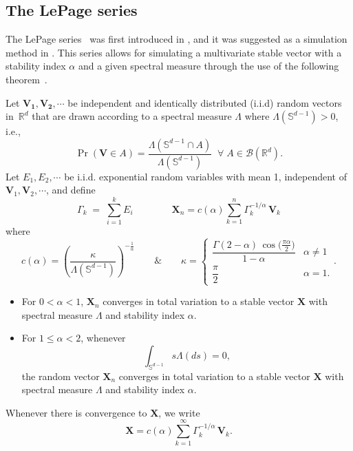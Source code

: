 \subsection{The LePage series}

The LePage series~\cite{SamorodnitskyGennady2000Snrp} was first introduced in \cite{LePageRaoul1981CtaS}, and it was suggested as a simulation method in \cite{Weron2004Computationally}. This series allows for simulating a multivariate stable vector with a stability index $\alpha$ and a given spectral measure through the use of the following theorem~\cite[Theorem 4]{BentkusV.2001LSRo}.
\begin{theorem}
\label{thm:spec2}
 Let $\mathbf{V_1},\mathbf{V_2},\cdots$ be independent and identically distributed (i.i.d) random vectors in~$\mathbb{R}^d$ that are drawn according to a spectral measure $\Lambda$ where $\Lambda(\mathbb{S}^{d-1})>0$, i.e.,
 \[
     \Pr(\mathbf{V}\in A)=\frac{\Lambda(\mathbb{S}^{d-1} ∩ A )}{\Lambda(\mathbb{S}^{d-1})} \;\;\forall\;A\in\mathcal{B}(\mathbb{R}^d).
 \]
 Let $E_1, E_2, \cdots$ be i.i.d. exponential random variables with mean 1, independent of  $\mathbf{V}_1, \mathbf{V}_2, \cdots$, and define
\begin{equation}
\label{LPseries}
\Gamma_k \;=\; \sum_{i=1}^k E_i \qquad
\qquad \mathbf{X}_n= c(\alpha)\sum_{k=1}^{n} \Gamma_k^{-1/\alpha}\,\mathbf{V}_k
\end{equation}
where  \[
c(\alpha)=\left(\frac{\kappa}{\Lambda(\mathbb{S}^{d-1})}\right)^{-\frac{1}{\alpha}} \qquad \& \qquad \kappa=\begin{cases}
\dfrac{\Gamma(2-\alpha)\,\cos\!\bigl(\tfrac{\pi\alpha}{2}\bigr)}{1-\alpha}
& \alpha\neq1\\
\dfrac{\pi}{2}
& \alpha=1.
\end{cases}.
\]
\begin{itemize}
\item[$\bullet$] For $0<\alpha<1$, $\mathbf{X}_n$ converges in total variation to a stable vector $\mathbf{X}$ with spectral measure $\Lambda$ and stability index $\alpha$.
\item[$\bullet$] For $1 \leq \alpha < 2$, whenever
\begin{equation}\label{eq:eq9}
\int_{\mathbb{S}^{d-1}}s\Lambda(ds)=0,
\end{equation}
the random vector $\mathbf{X}_n$ converges in total variation to a stable vector $\mathbf{X}$ with spectral measure $\Lambda$ and stability index $\alpha$.
\end{itemize}

Whenever there is convergence to $\mathbf{X}$, we write
\[
\mathbf{X}= c(\alpha)\sum_{k=1}^{\infty}\Gamma_k^{-1/\alpha}\,\mathbf{V}_k.
\]
\end{theorem}

